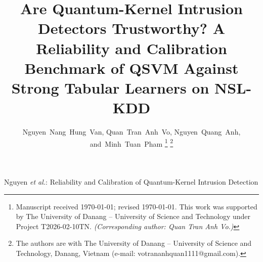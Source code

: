 \documentclass[journal]{IEEEtran}
\begin{document}
\let\flushbottom\raggedbottom
\raggedbottom

\title{Are Quantum-Kernel Intrusion Detectors Trustworthy?
  A Reliability and Calibration Benchmark of QSVM Against Strong
  Tabular Learners on NSL-KDD}

\author{Nguyen~Nang~Hung~Van,
        Quan~Tran~Anh~Vo,
        Nguyen~Quang~Anh,
        and~Minh~Tuan~Pham
\thanks{Manuscript received \today; revised \today. This work was
  supported by The University of Danang -- University of Science and
  Technology under Project T2026-02-10TN. \textit{(Corresponding author: Quan Tran Anh Vo.)}}
\thanks{The authors are with The University of Danang -- University of
  Science and Technology, Danang, Vietnam (e-mail:
  votrananhquan1111@gmail.com).}}

%
{Nguyen \MakeLowercase{\textit{et al.}}: Reliability and Calibration of Quantum-Kernel Intrusion Detection}

\maketitle
\end{document}
